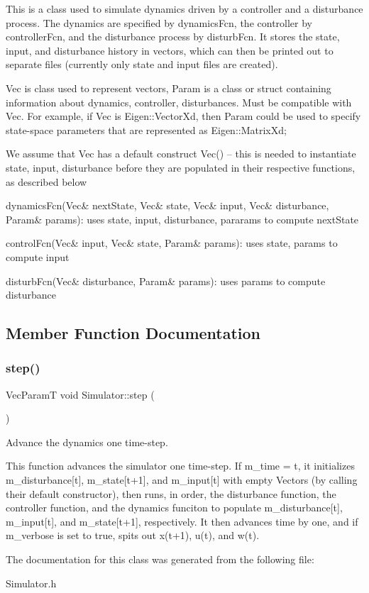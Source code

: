 This is a class used to simulate dynamics driven by a controller and a disturbance process. The dynamics are specified by dynamics\+Fcn, the controller by controller\+Fcn, and the disturbance process by disturb\+Fcn. It stores the state, input, and disturbance history in vectors, which can then be printed out to separate files (currently only state and input files are created).

Vec is class used to represent vectors, Param is a class or struct containing information about dynamics, controller, disturbances. Must be compatible with Vec. For example, if Vec is Eigen\+::\+Vector\+Xd, then Param could be used to specify state-\/space parameters that are represented as Eigen\+::\+Matrix\+Xd;

We assume that Vec has a default construct Vec() -- this is needed to instantiate state, input, disturbance before they are populated in their respective functions, as described below

dynamics\+Fcn(Vec\& next\+State, Vec\& state, Vec\& input, Vec\& disturbance, Param\& params)\+: uses state, input, disturbance, pararams to compute next\+State

control\+Fcn(\+Vec\& input, Vec\& state, Param\& params)\+: uses state, params to compute input

disturb\+Fcn(\+Vec\& disturbance, Param\& params)\+: uses params to compute disturbance 

\subsection{Member Function Documentation}
\mbox{\label{classSimulator_a3bdb2a9b121073e71e424203a9416b04}} 
\subsubsection{\texorpdfstring{step()}{step()}}
{\footnotesize\ttfamily Vec\+ParamT void Simulator\+::step (\begin{DoxyParamCaption}{ }\end{DoxyParamCaption})}



Advance the dynamics one time-\/step. 

This function advances the simulator one time-\/step. If m\+\_\+time = t, it initializes m\+\_\+disturbance\mbox{[}t\mbox{]}, m\+\_\+state\mbox{[}t+1\mbox{]}, and m\+\_\+input\mbox{[}t\mbox{]} with empty Vectors (by calling their default constructor), then runs, in order, the disturbance function, the controller function, and the dynamics funciton to populate m\+\_\+disturbance\mbox{[}t\mbox{]}, m\+\_\+input\mbox{[}t\mbox{]}, and m\+\_\+state\mbox{[}t+1\mbox{]}, respectively. It then advances time by one, and if m\+\_\+verbose is set to true, spits out x(t+1), u(t), and w(t). 

The documentation for this class was generated from the following file\+:\begin{DoxyCompactItemize}
\item 
Simulator.\+h\end{DoxyCompactItemize}
